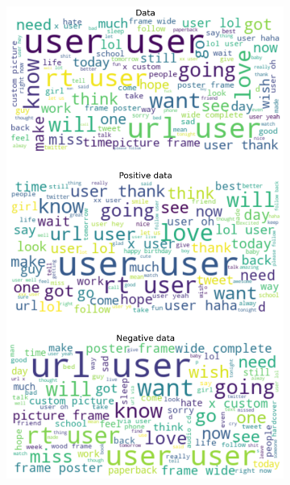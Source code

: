 \documentclass{article}
\begin{document}
\begin{itemize}
\begin{figure}[H]
\begin{subfigure}[b]{0.24\textwidth}
\includegraphics[width=\textwidth]{chapter-06/section-01-01/04/visualization/2/wordcloud.png}
\end{subfigure}
\begin{subfigure}[b]{0.24\textwidth}
\centering

\end{subfigure}
\end{figure}
\end{itemize}
\end{document}

